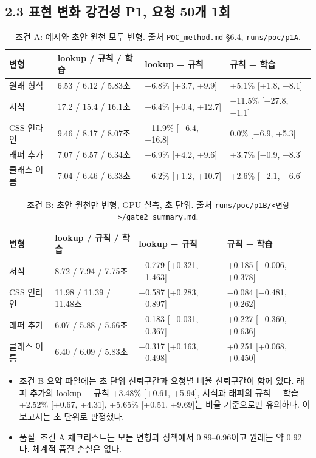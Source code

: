 \documentclass[10pt,a4paper]{article}
\begin{document}
\subsection*{2.3 표현 변화 강건성 P1, 요청 50개 1회}
\begin{table}[H]\centering\small
\caption*{조건 A: 예시와 초안 원천 모두 변형. 출처 \texttt{POC\_method.md} §6.4, \texttt{runs/poc/p1A}.}
\begin{tabular}{llll}
\toprule
변형 & lookup / 규칙 / 학습 & lookup − 규칙 & 규칙 − 학습\\
\midrule
원래 형식 & 6.53 / 6.12 / 5.83초 & +6.8\% [+3.7, +9.9] & +5.1\% [+1.8, +8.1]\\
서식 & 17.2 / 15.4 / 16.1초 & +6.4\% [+0.4, +12.7] & −11.5\% [−27.8, −1.1]\\
CSS 인라인 & 9.46 / 8.17 / 8.07초 & +11.9\% [+6.4, +16.8] & 0.0\% [−6.9, +5.3]\\
래퍼 추가 & 7.07 / 6.57 / 6.34초 & +6.9\% [+4.2, +9.6] & +3.7\% [−0.9, +8.3]\\
클래스 이름 & 7.04 / 6.46 / 6.33초 & +6.2\% [+1.2, +10.7] & +2.6\% [−2.1, +6.6]\\
\bottomrule
\end{tabular}
\end{table}
\begin{table}[H]\centering\small
\caption*{조건 B: 초안 원천만 변형, GPU 실측, 초 단위. 출처 \texttt{runs/poc/p1B/<변형>/gate2\_summary.md}.}
\begin{tabular}{llll}
\toprule
변형 & lookup / 규칙 / 학습 & lookup − 규칙 & 규칙 − 학습\\
\midrule
서식 & 8.72 / 7.94 / 7.75초 & +0.779 [+0.321, +1.463] & +0.185 [−0.006, +0.378]\\
CSS 인라인 & 11.98 / 11.39 / 11.48초 & +0.587 [+0.283, +0.897] & −0.084 [−0.481, +0.262]\\
래퍼 추가 & 6.07 / 5.88 / 5.66초 & +0.183 [−0.031, +0.367] & +0.227 [−0.360, +0.636]\\
클래스 이름 & 6.40 / 6.09 / 5.83초 & +0.317 [+0.163, +0.498] & +0.251 [+0.068, +0.450]\\
\bottomrule
\end{tabular}
\end{table}
\begin{itemize}[leftmargin=1.2em]
\item 조건 B 요약 파일에는 초 단위 신뢰구간과 요청별 비율 신뢰구간이 함께 있다. 래퍼 추가의 lookup − 규칙 +3.48\% [+0.61, +5.94], 서식과 래퍼의 규칙 − 학습 +2.52\% [+0.67, +4.31], +5.65\% [+0.51, +9.69]는 비율 기준으로만 유의하다. 이 보고서는 초 단위로 판정했다.
\item 품질: 조건 A 체크리스트는 모든 변형과 정책에서 0.89--0.96이고 원래는 약 0.92다. 체계적 품질 손실은 없다.
\end{itemize}
\end{document}
